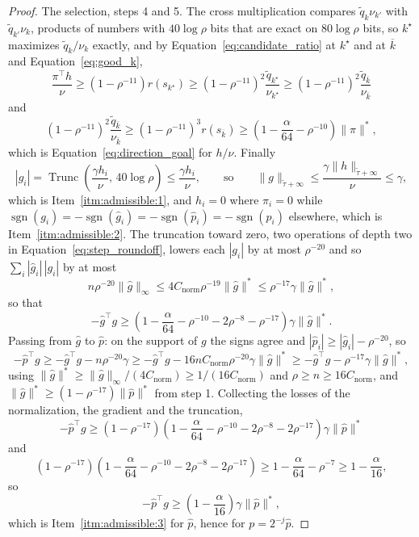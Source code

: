 \documentclass[11pt]{article}
\newcommand{\Trunc}{\operatorname{Trunc}}
\newcommand{\tautil}{\widetilde{\tau}}
\newcommand{\ghat}{\widehat{g}}
\newcommand{\sgn}{\operatorname{sgn}}
\newcommand{\Cnorm}{C_{\mathrm{norm}}}
\begin{document}
\begin{proof}
The selection, steps 4 and 5.
The cross multiplication compares $\widetilde{q}_k \nu_{k'}$ with
$\widetilde{q}_{k'} \nu_k$, products of numbers with
$40 \log \rho$ bits that are exact on
$80 \log \rho$ bits, so
$k^{\star}$ maximizes
$\widetilde{q}_k / \nu_k$ exactly, and by Equation~\eqref{eq:candidate_ratio} at
$k^{\star}$ and at
$\overline{k}$ and Equation~\eqref{eq:good_k},
\[
\frac{\pi^\top h}{\nu}
\ge
\left( 1 - \rho^{-11} \right) r(s_{k^{\star}})
\ge
\left( 1 - \rho^{-11} \right)^{2}
\frac{\widetilde{q}_{k^{\star}}}{\nu_{k^{\star}}}
\ge
\left( 1 - \rho^{-11} \right)^{2}
\frac{\widetilde{q}_{\overline{k}}}{\nu_{\overline{k}}}
\]
and
\[
\left( 1 - \rho^{-11} \right)^{2}
\frac{\widetilde{q}_{\overline{k}}}{\nu_{\overline{k}}}
\ge
\left( 1 - \rho^{-11} \right)^{3} r(s_{\overline{k}})
\ge
\left( 1 - \frac{\alpha}{64} - \rho^{-10} \right) \|\pi\|^{*},
\]
which is Equation~\eqref{eq:direction_goal} for $h / \nu$.
Finally
\[
|g_i|
=
\Trunc\left( \frac{\gamma h_i}{\nu}, \, 40 \log \rho \right)
\le
\frac{\gamma h_i}{\nu},
\qquad
\text{so}
\qquad
\|g\|_{\tautil + \infty}
\le
\frac{\gamma \|h\|_{\tautil + \infty}}{\nu}
\le
\gamma,
\]
which is Item~\ref{itm:admissible:1}, and $h_i = 0$ where
$\pi_i = 0$ while
$\sgn(g_i) = -\sgn(\ghat_i) = -\sgn(\widehat{p}_i) = -\sgn(p_i)$ elsewhere,
which is Item~\ref{itm:admissible:2}.
The truncation toward zero, two operations of depth two in
Equation~\eqref{eq:step_roundoff}, lowers each $|g_i|$ by at most
$\rho^{-20}$ and so
$\sum_i |\ghat_i| \, |g_i|$ by at most
\[
n \rho^{-20} \|\ghat\|_{\infty}
\le
4 \Cnorm \rho^{-19} \|\ghat\|^{*}
\le
\rho^{-17} \gamma \|\ghat\|^{*},
\]
so that
\[
- \ghat^\top g
\ge
\left( 1 - \frac{\alpha}{64} - \rho^{-10} - 2 \rho^{-8} - \rho^{-17} \right)
\gamma \|\ghat\|^{*} .
\]
Passing from $\ghat$ to
$\widehat{p}$: on the support of
$g$ the signs agree and
$|\widehat{p}_i| \ge |\ghat_i| - \rho^{-20}$, so
\[
- \widehat{p}^\top g
\ge
- \ghat^\top g - n \rho^{-20} \gamma
\ge
- \ghat^\top g - 16 n \Cnorm \rho^{-20} \gamma \|\ghat\|^{*}
\ge
- \ghat^\top g - \rho^{-17} \gamma \|\ghat\|^{*},
\]
using $\|\ghat\|^{*} \ge \|\ghat\|_{\infty} / (4 \Cnorm) \ge 1 / (16 \Cnorm)$
and $\rho \ge n \ge 16 \Cnorm$, and
$\|\ghat\|^{*} \ge (1 - \rho^{-17}) \|\widehat{p}\|^{*}$ from step 1.
Collecting the losses of the normalization, the gradient and the truncation,
\[
- \widehat{p}^\top g
\ge
\left( 1 - \rho^{-17} \right)
\left( 1 - \frac{\alpha}{64} - \rho^{-10} - 2 \rho^{-8} - 2 \rho^{-17} \right)
\gamma \|\widehat{p}\|^{*}
\]
and
\[
\left( 1 - \rho^{-17} \right)
\left( 1 - \frac{\alpha}{64} - \rho^{-10} - 2 \rho^{-8} - 2 \rho^{-17} \right)
\ge
1 - \frac{\alpha}{64} - \rho^{-7}
\ge
1 - \frac{\alpha}{16},
\]
so
\[
- \widehat{p}^\top g
\ge
\left( 1 - \frac{\alpha}{16} \right)
\gamma \|\widehat{p}\|^{*},
\]
which is Item~\ref{itm:admissible:3} for $\widehat{p}$, hence for
$p = 2^{-j} \widehat{p}$.


\end{proof}
\end{document}
